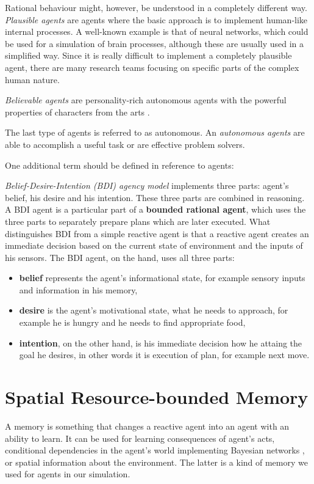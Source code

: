 Rational behaviour might, however, be understood in a completely different way. \emph{Plausible agents} are agents where the basic approach is to implement human-like internal processes. A well-known example is that of neural networks, which could be used for a simulation of brain processes, although these are usually used in a simplified way. Since it is really difficult to implement a completely plausible agent, there are many research teams focusing on specific parts of the complex human nature.

\emph{Believable agents} are personality-rich autonomous agents with the powerful properties of characters from the arts \cite{Loyall:believableagents}. 

The last type of agents is referred to as autonomous. An \emph{autonomous agents} are able to accomplish a useful task or are effective problem solvers.

One additional term should be defined in reference to agents:

\textit{Belief-Desire-Intention (BDI) agency model} implements three parts: agent's belief, his desire and his intention. These three parts are combined in reasoning. A BDI agent is a particular part of a \textbf{bounded rational agent}, which uses the three parts to separately prepare plans which are later executed. What distinguishes BDI from a simple reactive agent is that a reactive agent creates an immediate decision based on the current state of environment and the inputs of his sensors. The BDI agent, on the hand, uses all three parts:

\begin{itemize}
\item {\bf belief} represents the agent's informational state, for example sensory inputs and information in his memory,
\item {\bf desire} is the agent's motivational state, what he needs to approach, for example he is hungry and he needs to find appropriate food,
\item {\bf intention}, on the other hand, is his immediate decision how he attaing the goal he desires, in other words it is execution of plan, for example next move.
\end{itemize}

\section{Spatial Resource-bounded Memory}

A memory is something that changes a reactive agent into an agent with an ability to learn. It can be used for learning consequences of agent's acts, conditional dependencies in the agent's world implementing Bayesian networks \cite{Pearl:bayesian}, or spatial information about the environment. The latter is a kind of memory we used for agents in our simulation. 

